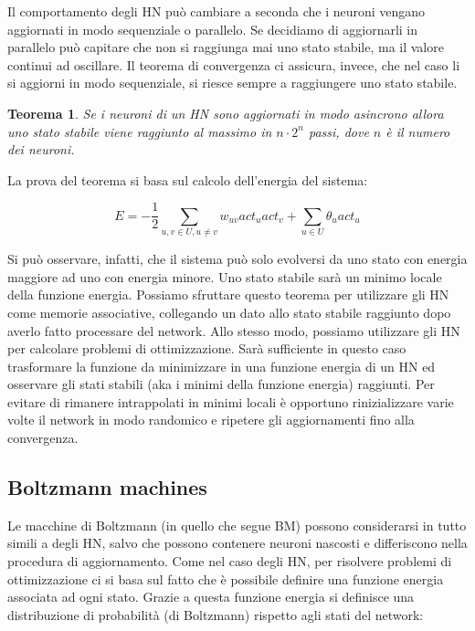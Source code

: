 \documentclass[10pt,a4paper]{article}
\newtheorem{theorem}{Teorema}
\begin{document}
Il comportamento degli HN può cambiare a seconda che i neuroni vengano aggiornati in modo sequenziale o parallelo. Se decidiamo di aggiornarli in parallelo può capitare che non si raggiunga mai uno stato stabile, ma il valore continui ad oscillare. Il teorema di convergenza ci assicura, invece, che nel caso li si aggiorni in modo sequenziale, si riesce sempre a raggiungere uno stato stabile.

\begin{theorem}
\emph{Se i neuroni di un HN sono aggiornati in modo asincrono allora uno stato stabile viene raggiunto al massimo in $n\cdot 2^n$ passi, dove $n$ è il numero dei neuroni.}
\end{theorem}

La prova del teorema si basa sul calcolo dell'energia del sistema:

$$
E = -\frac{1}{2} \sum_{u,v \in U, u \neq v} w_{uv}act_u act_v + \sum_{u \in U} \theta_u act_u
$$

Si può osservare, infatti, che il sistema può solo evolversi da uno stato con energia maggiore ad uno con energia minore. Uno stato stabile sarà un minimo locale della funzione energia. Possiamo sfruttare questo teorema per utilizzare gli HN come memorie associative, collegando un dato allo stato stabile raggiunto dopo averlo fatto processare del network. Allo stesso modo, possiamo utilizzare gli HN per calcolare problemi di ottimizzazione. Sarà sufficiente in questo caso trasformare la funzione da minimizzare in una funzione energia di un HN ed osservare gli stati stabili (aka i minimi della funzione energia) raggiunti. Per evitare di rimanere intrappolati in minimi locali è opportuno rinizializzare varie volte il network in modo randomico e ripetere gli aggiornamenti fino alla convergenza.

\subsection{Boltzmann machines}

Le macchine di Boltzmann (in quello che segue BM) possono considerarsi in tutto simili a degli HN, salvo che possono contenere neuroni nascosti e differiscono nella procedura di aggiornamento. Come nel caso degli HN, per risolvere problemi di ottimizzazione ci si basa sul fatto che è possibile definire una funzione energia associata ad ogni stato. Grazie a questa funzione energia si definisce una distribuzione di probabilità (di Boltzmann) rispetto agli stati del network:
\end{document}
